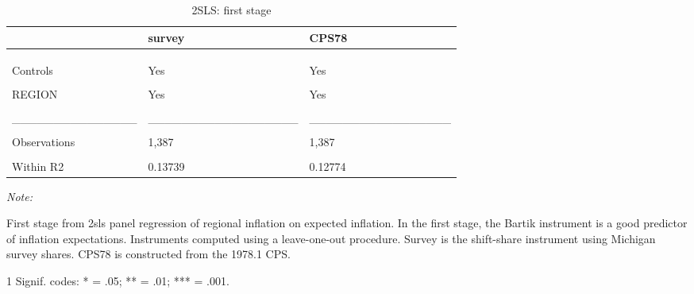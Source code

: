 \begin{table}

\caption{\label{tab:base:out:2sls:stage1}2SLS: first stage}
\centering
\begin{threeparttable}
\begin{tabular}[t]{lll}
\toprule
  & survey & CPS78\\
\midrule
\cellcolor{gray!6}{Dependent Var.:} & \cellcolor{gray!6}{pe} & \cellcolor{gray!6}{pe}\\
\addlinespace
 &  & \\
\addlinespace
\cellcolor{gray!6}{Bartik} & \cellcolor{gray!6}{0.2474*** (0.0611)} & \cellcolor{gray!6}{0.4478** (0.1448)}\\
\addlinespace
Controls & Yes & Yes\\
\addlinespace
\cellcolor{gray!6}{Fixed-Effects:} & \cellcolor{gray!6}{------------------} & \cellcolor{gray!6}{-----------------}\\
\addlinespace
REGION & Yes & Yes\\
\addlinespace
\cellcolor{gray!6}{TIME} & \cellcolor{gray!6}{Yes} & \cellcolor{gray!6}{Yes}\\
\addlinespace
\_\_\_\_\_\_\_\_\_\_\_\_\_\_\_ & \_\_\_\_\_\_\_\_\_\_\_\_\_\_\_\_\_\_ & \_\_\_\_\_\_\_\_\_\_\_\_\_\_\_\_\_\\
\addlinespace
\cellcolor{gray!6}{S.E. type} & \cellcolor{gray!6}{Drisco.-Kra. (L=4)} & \cellcolor{gray!6}{Drisc.-Kra. (L=4)}\\
\addlinespace
Observations & 1,387 & 1,387\\
\addlinespace
\cellcolor{gray!6}{R2} & \cellcolor{gray!6}{0.80353} & \cellcolor{gray!6}{0.80133}\\
\addlinespace
Within R2 & 0.13739 & 0.12774\\
\bottomrule
\end{tabular}
\begin{tablenotes}
\item \textit{Note: } 
\item First stage from 2sls panel regression of regional inflation on expected inflation. In the first stage, the Bartik instrument is a good predictor of inflation expectations. Instruments computed using a leave-one-out procedure. Survey is the shift-share instrument using Michigan survey shares. CPS78 is constructed from the 1978.1 CPS.
\item[1] Signif. codes: * = .05; ** = .01; *** = .001.
\end{tablenotes}
\end{threeparttable}
\end{table}
